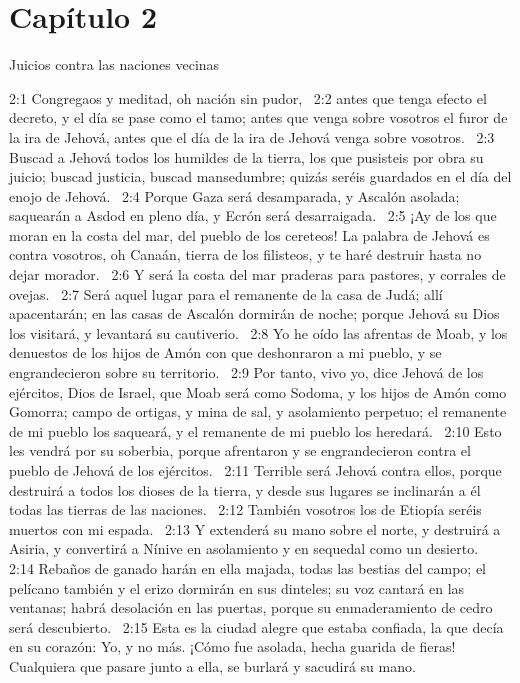 \section*{Capítulo 2}
Juicios contra las naciones vecinas  

2:1 Congregaos y meditad, oh nación sin pudor,  
2:2 antes que tenga efecto el decreto, y el día se pase como el tamo; antes que venga sobre vosotros el furor de la ira de Jehová, antes que el día de la ira de Jehová venga sobre vosotros.  
2:3 Buscad a Jehová todos los humildes de la tierra, los que pusisteis por obra su juicio; buscad justicia, buscad mansedumbre; quizás seréis guardados en el día del enojo de Jehová.  
2:4 Porque Gaza será desamparada, y Ascalón asolada; saquearán a Asdod en pleno día, y Ecrón será desarraigada.  
2:5 ¡Ay de los que moran en la costa del mar, del pueblo de los cereteos! La palabra de Jehová es contra vosotros, oh Canaán, tierra de los filisteos,  y te haré destruir hasta no dejar morador.  
2:6 Y será la costa del mar praderas para pastores, y corrales de ovejas.  
2:7 Será aquel lugar para el remanente de la casa de Judá; allí apacentarán; en las casas de Ascalón dormirán de noche; porque Jehová su Dios los visitará, y levantará su cautiverio.  
2:8 Yo he oído las afrentas de Moab,  y los denuestos de los hijos de Amón con que deshonraron a mi pueblo, y se engrandecieron sobre su territorio.  
2:9 Por tanto, vivo yo, dice Jehová de los ejércitos, Dios de Israel, que Moab será como Sodoma, y los hijos de Amón como Gomorra; campo de ortigas, y mina de sal, y asolamiento perpetuo; el remanente de mi pueblo los saqueará, y el remanente de mi pueblo los heredará.  
2:10 Esto les vendrá por su soberbia, porque afrentaron y se engrandecieron contra el pueblo de Jehová de los ejércitos.  
2:11 Terrible será Jehová contra ellos, porque destruirá a todos los dioses de la tierra, y desde sus lugares se inclinarán a él todas las tierras de las naciones.  
2:12 También vosotros los de Etiopía seréis muertos con mi espada.  
2:13 Y extenderá su mano sobre el norte, y destruirá a Asiria, y convertirá a Nínive en asolamiento y en sequedal como un desierto.  
2:14 Rebaños de ganado harán en ella majada, todas las bestias del campo; el pelícano también y el erizo dormirán en sus dinteles; su voz cantará en las ventanas; habrá desolación en las puertas, porque su enmaderamiento de cedro será descubierto.  
2:15 Esta es la ciudad alegre que estaba confiada, la que decía en su corazón: Yo, y no más. ¡Cómo fue asolada, hecha guarida de fieras! Cualquiera que pasare junto a ella, se burlará y sacudirá su mano.  
